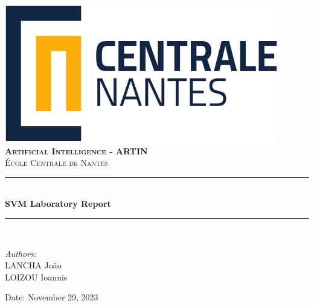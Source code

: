 \begin{titlepage}

\newcommand{\HRule}{\rule{\linewidth}{0.5mm}} %





\begin{center} %


\includegraphics[width = 6 cm]{./figures/ecn}\\[1.5cm] 
\textbf{\textsc{\Large Artificial Intelligence - ARTIN}}\\[1.0cm] 
\textsc{\Large École Centrale de Nantes}\\[0.5cm] 


\HRule \\[0.4cm]
{ \huge \bfseries SVM Laboratory Report}\\  %
\HRule \\[1.5cm]
\end{center}

\begin{flushleft} \large
\textit{Authors:}\\
LANCHA João\\
LOIZOU Ioannis\\
\end{flushleft}
\vspace{8cm}
\makeatletter
Date: November 29, 2023 

\vfill %



\makeatother


\end{titlepage}

